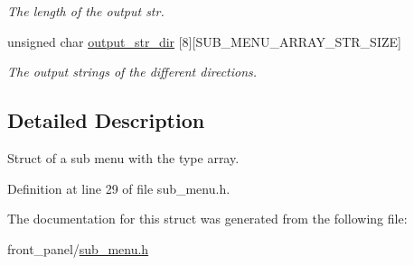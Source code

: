 \begin{CompactItemize}
\begin{CompactList}\small\item\em The length of the output str. \item\end{CompactList}\item 
\hypertarget{structstruct__sub__menu__array_d535ee8a83271a25defca75fc026ed08}{
unsigned char \hyperlink{structstruct__sub__menu__array_d535ee8a83271a25defca75fc026ed08}{output\_\-str\_\-dir} \mbox{[}8\mbox{]}\mbox{[}SUB\_\-MENU\_\-ARRAY\_\-STR\_\-SIZE\mbox{]}}
\label{structstruct__sub__menu__array_d535ee8a83271a25defca75fc026ed08}

\begin{CompactList}\small\item\em The output strings of the different directions. \item\end{CompactList}\end{CompactItemize}


\subsection{Detailed Description}
Struct of a sub menu with the type array. 

Definition at line 29 of file sub\_\-menu.h.

The documentation for this struct was generated from the following file:\begin{CompactItemize}
\item 
front\_\-panel/\hyperlink{sub__menu_8h}{sub\_\-menu.h}\end{CompactItemize}

